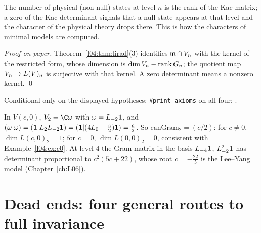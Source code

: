 \begin{physics}
The number of physical (non-null) states at level $n$ is the rank of the Kac matrix; a zero of the Kac
determinant signals that a null state appears at that level and the character of the physical theory drops
there. This is how the characters of minimal models are computed.
\end{physics}
\emph{Proof on paper.} Theorem~\ref{l04:thm:lirad}(3) identifies $\mathfrak{m}\cap V_n$ with the kernel of the
restricted form, whose dimension is $\dim V_n-\operatorname{rank}G_n$; the quotient map
$V_n\to L(V)_n$ is surjective with that kernel. A zero determinant means a nonzero kernel. \qed
\begin{status}
Conditional only on the displayed hypotheses; \texttt{\#print axioms} on all four: .
\end{status}

\begin{example}\label{l04:ex:vir2}
In $V(c,0)$, $\lfourV_2 = \C\omega$ with $\omega = L_{-2}\mathbf{1}$, and $(\omega|\omega) = (\mathbf{1}|L_2L_{-2}\mathbf{1}) =
(\mathbf{1}|(4L_0+\tfrac c2)\mathbf{1}) = \tfrac c2$. So $\mathrm{canGram}_2 = (c/2)$: for $c\ne0$, $\dim L(c,0)_2 = 1$; for
$c = 0$, $\dim L(0,0)_2 = 0$, consistent with Example~\ref{l04:ex:c0}. At level $4$ the Gram matrix in the basis
$L_{-4}\mathbf{1}$, $L_{-2}^2\mathbf{1}$ has determinant proportional to $c^2(5c+22)$, whose root $c = -\frac{22}5$ is the
Lee--Yang model (Chapter~\ref{ch:L06}).
\end{example}

\section{Dead ends: four general routes to full invariance}\label{l04:sec:deadends}

